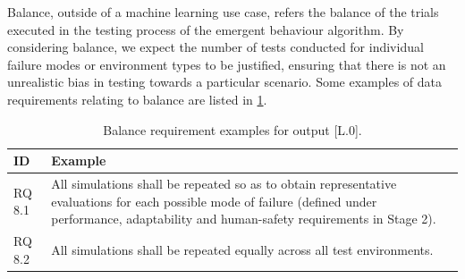 \documentclass[lettersize,journal]{IEEEtran}
\begin{document}
Balance, outside of a machine learning use case, refers the balance of the trials executed in the testing process of the emergent behaviour algorithm. By considering balance, we expect the number of tests conducted for individual failure modes or environment types to be justified, ensuring that there is not an unrealistic bias in testing towards a particular scenario. Some examples of data requirements relating to balance are listed in \ref{tab:L0_balance}.

\begin{table}[h]
    \centering
    \begin{tabular}{p{1cm} p{6cm}}
        \textbf{ID} & \textbf{Example} \\
        \hline
        RQ 8.1 & All simulations shall be repeated so as to obtain representative evaluations for each possible mode of failure (defined under performance, adaptability and human-safety requirements in Stage 2).\\
        \hline
        RQ 8.2 & All simulations shall be repeated equally across all test environments.\\
        \hline
    \end{tabular}
    \caption{Balance requirement examples for output [L.0].}
    \label{tab:L0_balance}
\end{table}

\end{document}
